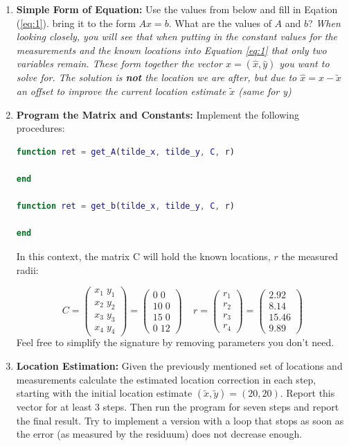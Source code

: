 \begin{enumerate}
   \item{\textbf{Simple Form of Equation:} Use the values from below and fill in Eqation (\ref{eq:1}). bring it to the
     form \(Ax=b\). What are the values of \(A\) and \(b\)? \newline \emph{When looking closely, you will see that when putting in the constant values for the measurements and the known locations into Equation \ref{eq:1} that only two variables remain. These form together the vector $x = (\hat x, \hat y)$ you want to solve for. The solution is \textbf{not} the location we are after, but due to $\hat x = x - \tilde x$ an offset to improve the current location estimate $\tilde x$ (same for y)}}
   \item{\textbf{Program the Matrix and Constants:} Implement the following procedures:
\begin{lstlisting}[language=MATLAB]
function ret = get_A(tilde_x, tilde_y, C, r)

end

function ret = get_b(tilde_x, tilde_y, C, r)

end
\end{lstlisting}
In this context, the matrix C will hold the known locations, $r$ the measured radii:

\[C= \begin{pmatrix}x_1\;y_1\\x_2\;y_2\\x_3\;y_3\\x_4\;y_4\end{pmatrix}=\begin{pmatrix}0\;0\\10\; 0\\15\;0\\0\;12\end{pmatrix} \;\;  \;\;r = \begin{pmatrix}r_1\\r_2\\r_3\\r_4\end{pmatrix}=\begin{pmatrix}2.92\\8.14\\15.46\\9.89\end{pmatrix}\]
Feel free to simplify the signature by removing parameters you don't need.
   }
   \item{\textbf{Location Estimation:}
Given the previously mentioned set of locations and measurements calculate the
estimated location correction in each step, starting with the initial
location estimate \((\tilde{x},\tilde{y}) =(20,20)\). Report this vector for at least 3 steps.
Then run the program for seven steps and report the final result. Try to implement a version with a  loop
that stops as soon as the error (as measured by the residuum) does not decrease enough.
   }
\end{enumerate}






